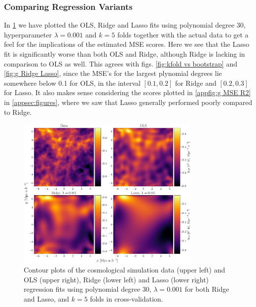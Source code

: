 \documentclass[aps,pra,english,notitlepage,reprint,nofootinbib]{revtex4-1}  %
\begin{document}
\subsubsection{Comparing Regression Variants}
In \cref{fig:density OLS Ridge Lasso} we have plotted the OLS, Ridge and Lasso fits using polynomial degree 30, hyperparameter  $\lambda=0.001$ and $k=5$ folds together with the actual data to get a feel for the implications of the estimated MSE scores. Here we see that the Lasso fit is significantly worse than both OLS and Ridge, although Ridge is lacking in comparison to OLS as well. This agrees with figs. \cref{fig:kfold vs bootstrap} and \cref{fig:g Ridge Lasso}, since the MSE's for the largest plynomial degrees lie somewhere below 0.1 for OLS, in the interval $[0.1,0.2]$ for Ridge and $[0.2,0.3]$ for Lasso. It also makes sense considering the scores plotted in \cref{appfig:g MSE R2} in \cref{appsec:figures}, where we saw that Lasso generally performed poorly compared to Ridge.

\begin{figure}
  \vspace*{-5pt}
  \centering %
  \includegraphics[width=0.8\textwidth]{../figs/density_OLS_Ridge_Lasso.pdf}
  \caption{Contour plots of the cosmological simulation data (upper left) and OLS (upper right), Ridge (lower left) and Lasso (lower right) regression fits using polynomial degree 30, $\lambda=0.001$ for both Ridge and Lasso, and $k=5$ folds in cross-validation.}\label{fig:density OLS Ridge Lasso}
  \vspace*{-5pt}
\end{figure}
\end{document}
